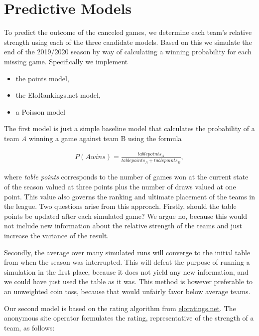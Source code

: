 \documentclass[12pt,a4paper]{article}
\begin{document}
\hypertarget{predictive-models}{%
\section{Predictive Models}\label{predictive-models}}

To predict the outcome of the canceled games, we determine each team's
relative strength using each of the three candidate models. Based on
this we simulate the end of the 2019/2020 season by way of calculating a
winning probability for each missing game. Specifically we implement

\begin{itemize}
\item the points model,
\item the EloRankings.net model, 
\item a Poisson model
\end{itemize}

The first model is just a simple baseline model that calculates the
probability of a team \emph{A} winning a game against team B using the
formula

\begin{align}
P(A wins) = \frac{table points_A}{{table points}_A + {table points}_B},
\end{align}

where \emph{table points} corresponds to the number of games won at the
current state of the season valued at three points plus the number of
draws valued at one point. This value also governs the ranking and
ultimate placement of the teams in the league. Two questions arise from
this approach. Firstly, should the table points be updated after each
simulated game? We argue no, because this would not include new
information about the relative strength of the teams and just increase
the variance of the result.

Secondly, the average over many simulated runs will converge to the
initial table from when the season was interrupted. This will defeat the
purpose of running a simulation in the first place, because it does not
yield any new information, and we could have just used the table as it
was. This method is however preferable to an unweighted coin toss,
because that would unfairly favor below average teams.

Our second model is based on the rating algorithm from
\href{eloratings.net/about}{eloratings.net}. The anonymous site operator
formulates the rating, representative of the strength of a team, as
follows:
\end{document}
